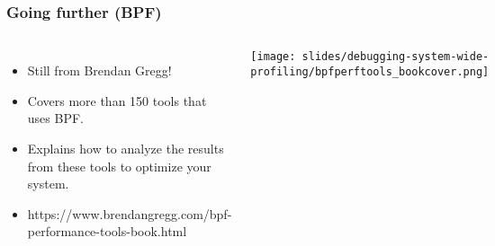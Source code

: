 \begin{frame}[fragile]
  \frametitle{Going further (BPF)}
  \begin{columns}[T]
    \begin{itemize}
    \item Still from Brendan Gregg!
    \item Covers more than 150 tools that uses BPF.
    \item Explains how to analyze the results from these tools to optimize
      your system.
    \item https://www.brendangregg.com/bpf-performance-tools-book.html
    \end{itemize}
    \texttt{[image: slides/debugging-system-wide-profiling/bpfperftools\_bookcover.png]}\\ 
  \end{columns}
\end{frame}